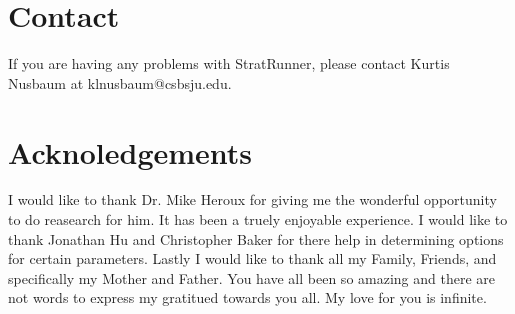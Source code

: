 \documentclass{article}
\begin{document}
\section{Contact}

If you are having any problems with StratRunner, please contact Kurtis Nusbaum at klnusbaum@csbsju.edu.

\section{Acknoledgements}

I would like to thank Dr. Mike Heroux for giving me the wonderful opportunity to do reasearch for him. It has been a truely enjoyable experience. I 
would like to thank Jonathan Hu and Christopher Baker for there help in determining options for certain parameters. Lastly I would like to thank all
my Family, Friends, and specifically my Mother and Father. You have all been so amazing and there are not words to express my gratitued towards you all.
My love for you is infinite.
\end{document}
